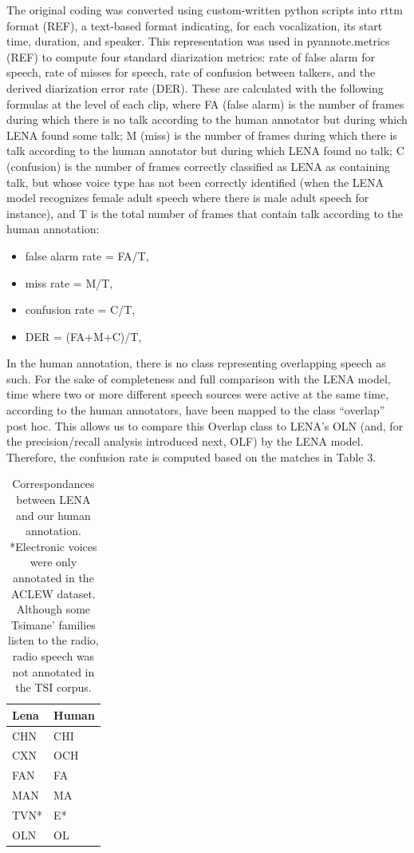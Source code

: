 \documentclass[english,floatsintext,man]{apa6}
\providecommand{\tightlist}{%
  \setlength{\itemsep}{0pt}\setlength{\parskip}{0pt}}
\begin{document}
The original coding was converted using custom-written python scripts
into rttm format (REF), a text-based format indicating, for each
vocalization, its start time, duration, and speaker. This representation
was used in pyannote.metrics (REF) to compute four standard diarization
metrics: rate of false alarm for speech, rate of misses for speech, rate
of confusion between talkers, and the derived diarization error rate
(DER). These are calculated with the following formulas at the level of
each clip, where FA (false alarm) is the number of frames during which
there is no talk according to the human annotator but during which LENA
found some talk; M (miss) is the number of frames during which there is
talk according to the human annotator but during which LENA found no
talk; C (confusion) is the number of frames correctly classified as LENA
as containing talk, but whose voice type has not been correctly
identified (when the LENA model recognizes female adult speech where
there is male adult speech for instance), and T is the total number of
frames that contain talk according to the human annotation:

\begin{itemize}
\tightlist
\item
  false alarm rate = FA/T,
\item
  miss rate = M/T,
\item
  confusion rate = C/T,
\item
  DER = (FA+M+C)/T,
\end{itemize}

In the human annotation, there is no class representing overlapping
speech as such. For the sake of completeness and full comparison with
the LENA model, time where two or more different speech sources were
active at the same time, according to the human annotators, have been
mapped to the class \enquote{overlap} post hoc. This allows us to
compare this Overlap class to LENA's OLN (and, for the precision/recall
analysis introduced next, OLF) by the LENA model. Therefore, the
confusion rate is computed based on the matches in Table 3.

\begin{table}[t]

\caption{\label{tab:tab-tsicor}Correspondances between LENA and our human annotation. *Electronic voices were only annotated in the ACLEW dataset. Although some Tsimane' families listen to the radio, radio speech was not annotated in the TSI corpus.}
\centering
\begin{tabular}{>{\raggedright\arraybackslash}p{2cm}>{\raggedright\arraybackslash}p{2cm}}
\toprule
Lena & Human\\
\midrule
CHN & CHI\\
CXN & OCH\\
FAN & FA\\
MAN & MA\\
TVN* & E*\\
\addlinespace
OLN & OL\\
\bottomrule
\end{tabular}
\end{table}
\end{document}
